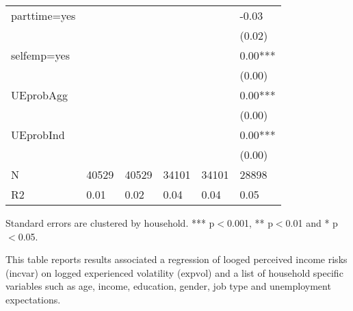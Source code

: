 \begin{table}[p]
\begin{adjustbox}{width=\textwidth}
\begin{threeparttable}
\begin{tabular}{llllll}
parttime=yes     &          &           &            &             &        -0.03 \\
                 &          &           &            &             &       (0.02) \\
selfemp=yes      &          &           &            &             &      0.00*** \\
                 &          &           &            &             &       (0.00) \\
UEprobAgg        &          &           &            &             &      0.00*** \\
                 &          &           &            &             &       (0.00) \\
UEprobInd        &          &           &            &             &      0.00*** \\
                 &          &           &            &             &       (0.00) \\
N                &    40529 &     40529 &      34101 &       34101 &        28898 \\
R2               &     0.01 &      0.02 &       0.04 &        0.04 &         0.05 \\
\bottomrule
\end{tabular}
\begin{tablenotes}\item Standard errors are clustered by household. *** p$<$0.001, ** p$<$0.01 and * p$<$0.05. 
\item This table reports results associated a regression of looged perceived income risks (incvar) on logged experienced volatility ($\text{expvol}$) and a list of household specific variables such as age, income, education, gender, job type and unemployment expectations.
\end{tablenotes}
\end{threeparttable}
\end{adjustbox}
\end{table}
